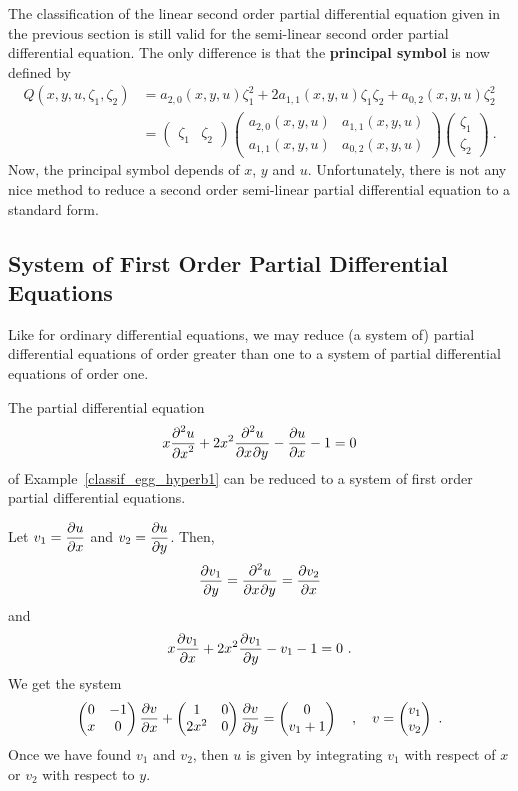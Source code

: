 The classification of the linear second order partial differential
equation given in the previous section is still valid for the
semi-linear second order partial differential equation.  The only
difference is that the {\bfseries principal symbol}
is now defined by
\begin{align*}
Q(x,y,u,\zeta_1,\zeta_2) &= a_{2,0}(x,y,u) \zeta_1^2 +
2a_{1,1}(x,y,u)\zeta_1\zeta_2 + a_{0,2}(x,y,u) \zeta_2^2 \\
&=
\begin{pmatrix}
\zeta_1 & \zeta_2
\end{pmatrix}
\begin{pmatrix}
a_{2,0}(x,y,u) & a_{1,1}(x,y,u) \\
a_{1,1}(x,y,u) & a_{0,2}(x,y,u)  
\end{pmatrix}
\begin{pmatrix}
\zeta_1 \\ \zeta_2
\end{pmatrix} \ .
\end{align*}
Now, the principal symbol depends of $x$, $y$ and $u$.  Unfortunately,
there is not any nice method to reduce a second order semi-linear
partial differential equation to a standard form.

\subsection{System of First Order Partial Differential Equations}

Like for ordinary differential equations, we may reduce (a system of)
partial differential equations of order greater
than one to a system of partial differential equations of order one.

\begin{egg}
The partial differential equation
\[
x \pdydxn{u}{x}{2} + 2 x^2 \pdydxnm{u}{x}{y}{2}{}{} - \pdydx{u}{x} - 1
= 0
\]
of Example~\ref{classif_egg_hyperb1} can be reduced to a system of
first order partial differential equations.

Let $\DS v_1 = \pdydx{u}{x}$ and
$\DS v_2 = \pdydx{u}{y}$.  Then,
\[
\pdydx{v_1}{y} = \pdydxnm{u}{x}{y}{2}{}{} = \pdydx{v_2}{x}
\]
and
\[
x \pdydx{v_1}{x} + 2 x^2 \pdydx{v_1}{y} - v_1 - 1 = 0 \  .
\]
We get the system
\[
\begin{pmatrix}
0 & -1 \\
x & 0
\end{pmatrix}
\pdydx{v}{x}
+
\begin{pmatrix}
1 & 0 \\
2x^2 & 0
\end{pmatrix}
\pdydx{v}{y}
=
\begin{pmatrix}
0 \\ v_1+1
\end{pmatrix} \quad , \quad
v =
\begin{pmatrix}
v_1 \\ v_2
\end{pmatrix} \ .
\]
Once we have found $v_1$ and $v_2$, then $u$ is
given by integrating $v_1$ with respect of $x$ or $v_2$ with
respect to $y$.
\end{egg}

